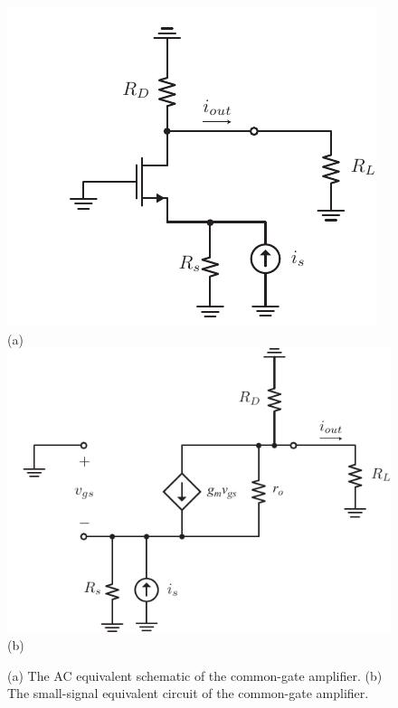 \begin{figure}[H]
\centering
\includegraphics[scale=1.05]{cgamp_is_ac}\\[0.1cm]
(a)\\
\includegraphics[scale=1.05]{cgamp_is_ac_ss}\\
(b)\\
\caption{(a) The AC equivalent schematic of the common-gate amplifier.  (b) The small-signal equivalent circuit of the common-gate amplifier.}
\label{fig:cgamp_is_ac}
\end{figure}
\newpage
